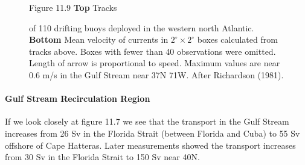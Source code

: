\begin{figure}[t!]
\footnotesize
Figure 11.9 \textbf{Top} Tracks \rule{0mm}{2ex}of 110 drifting buoys
deployed in the western north Atlantic.  \textbf{Bottom} Mean velocity of currents in $2^{\circ}
\times 2^{\circ}$ boxes calculated from tracks above. Boxes with fewer
than 40 observations were omitted.  Length of arrow is proportional to
speed. Maximum values are near 0.6 m/s in the Gulf Stream near
37\degrees N 71\degrees W. After Richardson (1981).

\label{fig:drifters}
\vspace{-5ex}
\end{figure}

\paragraph{Gulf Stream Recirculation Region}
If we look closely at figure 11.7 we see
that the transport in the Gulf Stream
increases from 26 Sv in the Florida Strait (between Florida and Cuba)
to 55 Sv offshore of Cape Hatteras. Later measurements showed the
transport increases from 30 Sv in the Florida Strait to 150 Sv near
40\degrees N.

